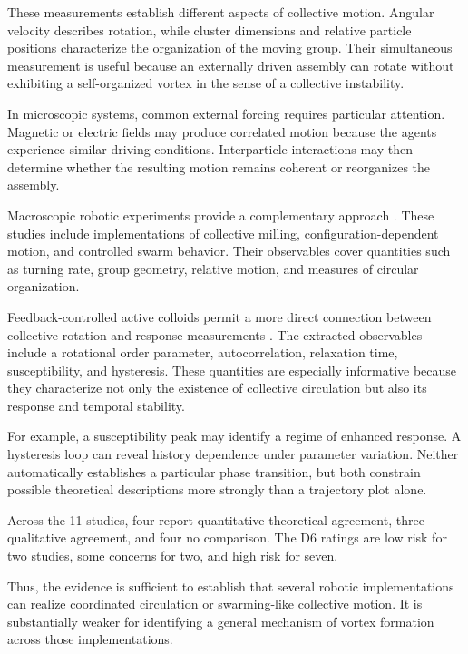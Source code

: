 These measurements establish different aspects
of collective motion. Angular velocity describes
rotation, while cluster dimensions and relative
particle positions characterize the organization
of the moving group. Their simultaneous
measurement is useful because an externally
driven assembly can rotate without exhibiting
a self-organized vortex in the sense of
a collective instability.

In microscopic systems, common external forcing
requires particular attention. Magnetic or
electric fields may produce correlated motion
because the agents experience similar driving
conditions. Interparticle interactions may
then determine whether the resulting motion
remains coherent or reorganizes the assembly.



Macroscopic robotic experiments provide
a complementary approach
\cite{Vega2023simulatelessexpec,Zhou2025gazingpreferencein,Zhu2025amillingswarmofg,Abpeikar2023iterativetransferl}.
These studies include implementations
of collective milling, configuration-dependent
motion, and controlled swarm behavior.
Their observables cover quantities such as
turning rate, group geometry, relative motion,
and measures of circular organization.



Feedback-controlled active colloids permit
a more direct connection between collective
rotation and response measurements
\cite{Lffler2021behaviordependentc}.
The extracted observables include a rotational
order parameter, autocorrelation, relaxation
time, susceptibility, and hysteresis.
These quantities are especially informative
because they characterize not only the
existence of collective circulation but
also its response and temporal stability.

For example, a susceptibility peak may
identify a regime of enhanced response.
A hysteresis loop can reveal history
dependence under parameter variation.
Neither automatically establishes
a particular phase transition, but
both constrain possible theoretical
descriptions more strongly than
a trajectory plot alone.

Across the 11 studies, four report
quantitative theoretical agreement,
three qualitative agreement, and
four no comparison. The D6 ratings
are low risk for two studies,
some concerns for two, and
high risk for seven.

Thus, the evidence is sufficient
to establish that several robotic
implementations can realize
coordinated circulation or
swarming-like collective motion.
It is substantially weaker
for identifying a general
mechanism of vortex formation
across those implementations.

